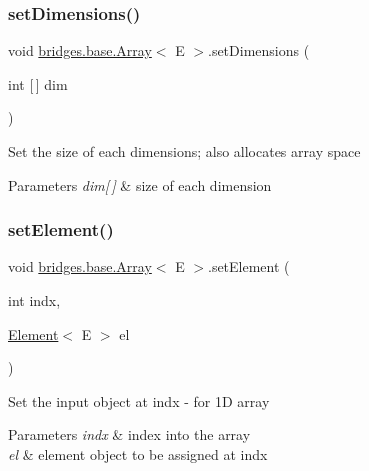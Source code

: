 \subsubsection{\texorpdfstring{set\+Dimensions()}{setDimensions()}}
{\footnotesize\ttfamily void \mbox{\hyperlink{classbridges_1_1base_1_1_array}{bridges.\+base.\+Array}}$<$ E $>$.set\+Dimensions (\begin{DoxyParamCaption}\item[{int \mbox{[}$\,$\mbox{]}}]{dim }\end{DoxyParamCaption})}

Set the size of each dimensions; also allocates array space


\begin{DoxyParams}{Parameters}
{\em dim\mbox{[}$\,$\mbox{]}} & size of each dimension \\
\hline
\end{DoxyParams}
\mbox{\label{classbridges_1_1base_1_1_array_aafde1304d602e8b0f673dd61bc00c18f}} 
\subsubsection{\texorpdfstring{set\+Element()}{setElement()}\hspace{0.1cm}{\footnotesize\ttfamily [1/3]}}
{\footnotesize\ttfamily void \mbox{\hyperlink{classbridges_1_1base_1_1_array}{bridges.\+base.\+Array}}$<$ E $>$.set\+Element (\begin{DoxyParamCaption}\item[{int}]{indx,  }\item[{\mbox{\hyperlink{classbridges_1_1base_1_1_element}{Element}}$<$ E $>$}]{el }\end{DoxyParamCaption})}

Set the input object at \textquotesingle{}indx\textquotesingle{} -\/ for 1D array


\begin{DoxyParams}{Parameters}
{\em indx} & index into the array \\
\hline
{\em el} & element object to be assigned at \textquotesingle{}indx\textquotesingle{} \\
\hline
\end{DoxyParams}
\mbox{\label{classbridges_1_1base_1_1_array_a5e43e6d56cfeaf6a1b193b0ea16f7696}} 

